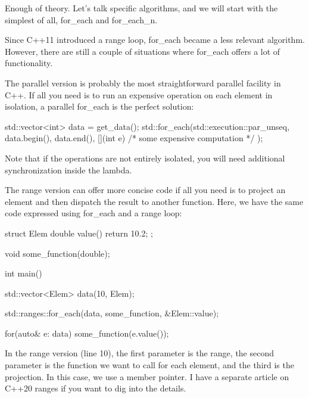 Enough of theory. Let’s talk specific algorithms, and we will start with the simplest of all, for\_each and for\_each\_n.


Since C++11 introduced a range loop, for\_each became a less relevant algorithm. However, there are still a couple of situations where for\_each offers a lot of functionality.

The parallel version is probably the most straightforward parallel facility in C++. If all you need is to run an expensive operation on each element in isolation, a parallel for\_each is the perfect solution:

\begin{box-note}
\begin{cppcode}
std::vector<int> data = get_data();
std::for_each(std::execution::par_unseq, 
    data.begin(), data.end(),
    [](int e) { /* some expensive computation */ });
\end{cppcode}
\end{box-note}

Note that if the operations are not entirely isolated, you will need additional synchronization inside the lambda.

The range version can offer more concise code if all you need is to project an element and then dispatch the result to another function. Here, we have the same code expressed using for\_each and a range loop:

\begin{box-note}
\begin{cppcode}
struct Elem {
    double value() { return 10.2; }
};

void some_function(double);

int main() {
    std::vector<Elem> data(10, Elem{});
    
    std::ranges::for_each(data, some_function, &Elem::value);

    for(auto& e: data) {
        some_function(e.value());
    }
}
\end{cppcode}
\end{box-note}

In the range version (line 10), the first parameter is the range, the second parameter is the function we want to call for each element, and the third is the projection. In this case, we use a member pointer. I have a separate article on C++20 ranges if you want to dig into the details.

